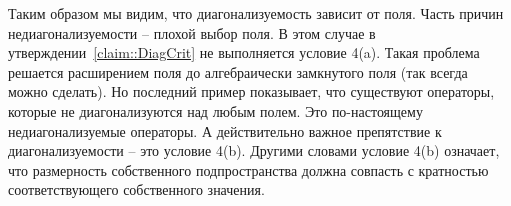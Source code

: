 Таким образом мы видим, что диагонализуемость зависит от поля.
Часть причин недиагонализуемости -- плохой выбор поля.
В этом случае в утверждении~\ref{claim::DiagCrit} не выполняется условие 4(a).
Такая проблема решается расширением поля до алгебраически замкнутого поля (так всегда можно сделать).
Но последний пример показывает, что существуют операторы, которые не диагонализуются над любым полем.
Это по-настоящему недиагонализуемые операторы.
А действительно важное препятствие к диагонализуемости -- это условие 4(b).
Другими словами условие 4(b) означает, что размерность собственного подпространства должна совпасть с кратностью соответствующего собственного значения.
